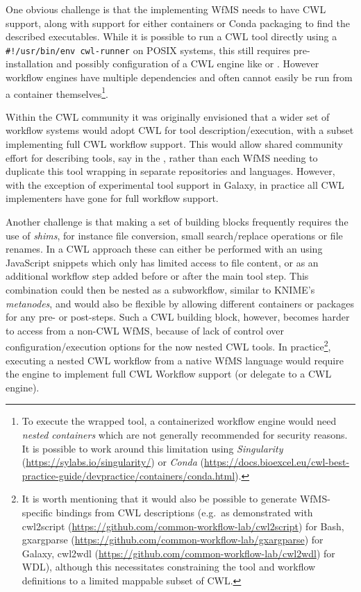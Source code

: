 One obvious challenge is that the implementing WfMS needs to have CWL support, along with support for either containers or Conda packaging to find the described executables.
While it is possible to run a CWL tool directly using a \texttt{\#!/usr/bin/env\ cwl-runner}  on POSIX systems, this still requires pre-installation and possibly configuration of a CWL engine like  or  \cite{Vivian 2017}.
However workflow engines have multiple dependencies and often cannot easily be run from a container themselves\footnote{To execute the wrapped tool, a containerized workflow engine would need \emph{nested containers} which are not generally recommended for security reasons.
It is possible to work around this limitation using \emph{Singularity} (\url{https://sylabs.io/singularity/}) or \emph{Conda} (\url{https://docs.bioexcel.eu/cwl-best-practice-guide/devpractice/containers/conda.html}).}.

Within the CWL community it was originally envisioned that a wider set of workflow systems would adopt CWL for tool description/execution, with a subset implementing full CWL workflow support.
This would allow shared community effort for describing tools, say in the , rather than each WfMS needing to duplicate this tool wrapping in separate repositories and languages.
However, with the exception of experimental tool support in Galaxy, in practice all CWL implementers have gone for full workflow support.

Another challenge is that making a set of building blocks frequently requires the use of \emph{shims}, for instance file conversion, small search/replace operations or file renames.
In a CWL approach these can either be performed with an  using JavaScript snippets which only has limited access to file content, or as an additional workflow step added before or after the main tool step.
This combination could then be nested as a subworkflow, similar to KNIME's \emph{metanodes}, and would also be flexible by allowing different containers or packages for any pre- or post-steps.
Such a CWL building block, however, becomes harder to access from a non-CWL WfMS, because of lack of control over configuration/execution options for the
now nested CWL tools.
In practice\footnote{It is worth mentioning that it would also be possible to generate WfMS-specific bindings from CWL descriptions 
(e.g.~as demonstrated with 
cwl2script (\url{https://github.com/common-workflow-lab/cwl2script}) for Bash, 
gxargparse (\url{https://github.com/common-workflow-lab/gxargparse}) for Galaxy, 
cwl2wdl (\url{https://github.com/common-workflow-lab/cwl2wdl}) for WDL), 
although this necessitates constraining the tool and workflow definitions to a limited mappable subset of CWL.}, executing a nested CWL workflow from a native WfMS language would require the engine to implement full CWL Workflow support (or delegate to a CWL engine).

